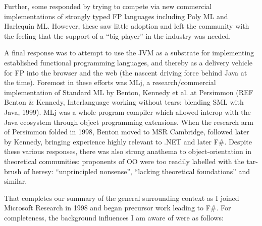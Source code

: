 \documentclass[acmsmall,review]{acmart}\settopmatter{printfolios=true,printccs=false,printacmref=false}
\begin{document}
Further, some responded by trying to compete via new commercial implementations of strongly typed FP languages including Poly ML and Harlequin ML. However, these saw little adoption and left the community with the feeling that the support of a “big player” in the industry was needed. 

A final response was to attempt to use the JVM as a substrate for implementing established functional programming languages, and thereby as a delivery vehicle for FP into the browser and the web (the nascent driving force behind Java at the time).  Foremost in these efforts was MLj, a research/commercial implementation of Standard ML by Benton, Kennedy et al. at Persimmon (REF Benton \& Kennedy, Interlanguage working without tears: blending SML with Java, 1999).  MLj was a whole-program compiler which allowed interop with the Java ecosystem through object programming extensions. When the research arm of Persimmon folded in 1998, Benton moved to MSR Cambridge, followed later by Kennedy, bringing experience highly relevant to .NET and later F\#. Despite these various responses, there was also strong anathema to object-orientation in theoretical communities: proponents of OO were too readily labelled with the tar-brush of heresy: “unprincipled nonsense”, “lacking theoretical foundations” and similar.  

That completes our summary of the general surrounding context as I joined Microsoft Research in 1998 and began precursor work leading to F\#. For completeness, the background influences I am aware of were as follows:
\end{document}
